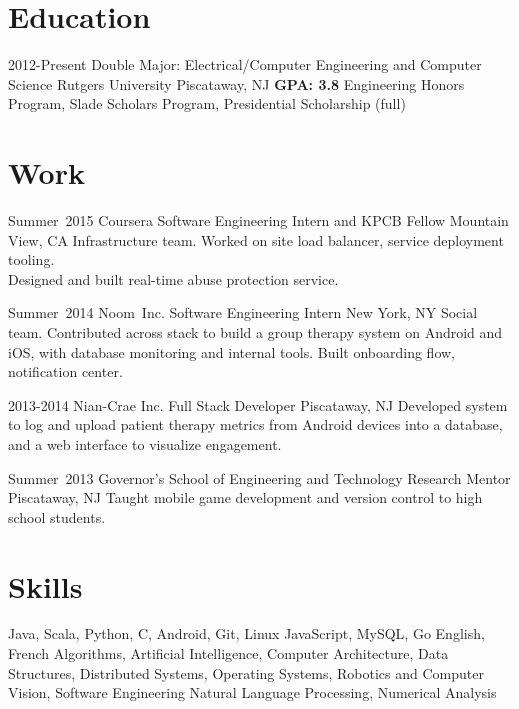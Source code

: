 \documentclass[11pt,letterpaper]{moderncv}
\begin{document}
\maketitle

\section{Education}
\cventry
    {2012-Present}
    {Double Major: Electrical/Computer Engineering and Computer Science}
    {\break Rutgers University}
    {Piscataway, NJ}
    {\textbf{GPA: 3.8}}
    {Engineering Honors Program, Slade Scholars Program, Presidential Scholarship (full)}

\section{Work}
    \cventry
        {Summer~2015}
        {Coursera}
        {Software Engineering Intern and KPCB Fellow}
        {Mountain View, CA}
        {}
        {Infrastructure team. Worked on site load balancer, service deployment tooling. \\Designed and built real-time abuse protection service. \\}

    \cventry
        {Summer~2014}
        {Noom~Inc.}
        {Software Engineering Intern}
        {New York, NY}
        {}
        {Social team. Contributed across stack to build a group therapy system on Android and iOS, with database monitoring and internal tools. Built onboarding flow, notification center.\\}

    \cventry
        {2013-2014}
        {Nian-Crae Inc.}
        {Full Stack Developer}
        {Piscataway, NJ}
        {}
        {Developed system to log and upload patient therapy metrics from Android devices into a database,\\and a web interface to visualize engagement.\\}

    \cventry
        {Summer~2013}
        {Governor's School of Engineering and Technology}
        {Research Mentor}
        {Piscataway, NJ}
        {}
        {Taught mobile game development and version control to high school students.}

\section{Skills}
       {Java, Scala, Python, C, Android, Git, Linux}
       {JavaScript, MySQL, Go}
       {English, French}
       {Algorithms, Artificial Intelligence, Computer Architecture, Data Structures, Distributed Systems, Operating Systems, Robotics and Computer Vision, Software Engineering}
       {Natural Language Processing, Numerical Analysis}
\end{document}
